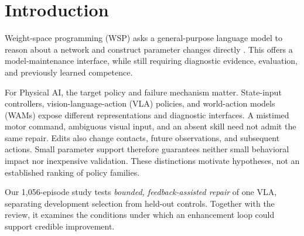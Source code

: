 \section{Introduction}
Weight-space programming (WSP) asks a general-purpose language model to reason about a network and construct parameter changes directly \citep{takehi2026sparks}. This offers a model-maintenance interface, while still requiring diagnostic evidence, evaluation, and previously learned competence.

For Physical AI, the target policy and failure mechanism matter. State-input controllers, vision-language-action (VLA) policies, and world-action models (WAMs) expose different representations and diagnostic interfaces. A mistimed motor command, ambiguous visual input, and an absent skill need not admit the same repair. Edits also change contacts, future observations, and subsequent actions. Small parameter support therefore guarantees neither small behavioral impact nor inexpensive validation. These distinctions motivate hypotheses, not an established ranking of policy families.

Our 1,056-episode study tests \emph{bounded, feedback-assisted repair} of one VLA, separating development selection from held-out controls. Together with the review, it examines the conditions under which an enhancement loop could support credible improvement.
